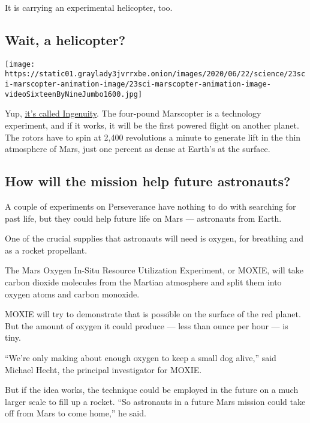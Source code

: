 It is carrying an experimental helicopter, too.

\hypertarget{wait-a-helicopter}{%
\subsection{Wait, a helicopter?}\label{wait-a-helicopter}}

\texttt{[image: https://static01.graylady3jvrrxbe.onion/images/2020/06/22/science/23sci-marscopter-animation-image/23sci-marscopter-animation-image-videoSixteenByNineJumbo1600.jpg]}

Yup,
\href{https://www.nytimes3xbfgragh.onion/2020/06/23/science/mars-helicopter-nasa.html}{it's
called Ingenuity}. The four-pound Marscopter is a technology experiment,
and if it works, it will be the first powered flight on another planet.
The rotors have to spin at 2,400 revolutions a minute to generate lift
in the thin atmosphere of Mars, just one percent as dense at Earth's at
the surface.

\hypertarget{how-will-the-mission-help-future-astronauts}{%
\subsection{How will the mission help future
astronauts?}\label{how-will-the-mission-help-future-astronauts}}

A couple of experiments on Perseverance have nothing to do with
searching for past life, but they could help future life on Mars ---
astronauts from Earth.

One of the crucial supplies that astronauts will need is oxygen, for
breathing and as a rocket propellant.

The Mars Oxygen In-Situ Resource Utilization Experiment, or MOXIE, will
take carbon dioxide molecules from the Martian atmosphere and split them
into oxygen atoms and carbon monoxide.

MOXIE will try to demonstrate that is possible on the surface of the red
planet. But the amount of oxygen it could produce --- less than ounce
per hour --- is tiny.

``We're only making about enough oxygen to keep a small dog alive,''
said Michael Hecht, the principal investigator for MOXIE.

But if the idea works, the technique could be employed in the future on
a much larger scale to fill up a rocket. ``So astronauts in a future
Mars mission could take off from Mars to come home,'' he said.

